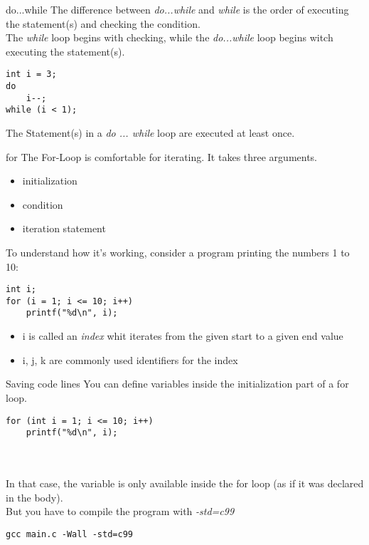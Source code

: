 \begin{frame}[fragile]{do...while}
	The difference between \textit{do...while} and \textit{while} is the order of executing the statement(s) and checking the condition.\\
	The \textit{while} loop begins with checking, while the \textit{do...while} loop begins witch executing the statement(s).
	\begin{lstlisting}[numbers=none]
int i = 3;
do
	i--;
while (i < 1);
\end{lstlisting}
	The Statement(s) in a \textit{do ... while} loop are executed at least once.
\end{frame}
\begin{frame}[fragile]{for}
	The For-Loop is comfortable for iterating. It takes three arguments.
	\begin{itemize}
		\item initialization
		\item condition
		\item iteration statement
	\end{itemize}
	To understand how it's working, consider a program printing the numbers 1 to 10:
	\begin{lstlisting}[numbers=none]
int i;
for (i = 1; i <= 10; i++)
	printf("%d\n", i);
\end{lstlisting}
	\begin{itemize}
		\item i is called an \textit{index} whit iterates from the given start to a given end value
		\item i, j, k are commonly used identifiers for the index
	\end{itemize}
\end{frame}
\begin{frame}[fragile]{Saving code lines}
	You can define variables inside the initialization part of a for loop.
	\begin{lstlisting}[numbers=none]
for (int i = 1; i <= 10; i++)
	printf("%d\n", i);
\end{lstlisting}
	\ \\\ \\In that case, the variable is only available inside the for loop (as if it was declared in the body).\\
	But you have to compile the program with \textit{-std=c99}
	\begin{lstlisting}[numbers=none]
gcc main.c -Wall -std=c99
\end{lstlisting}
\end{frame}
